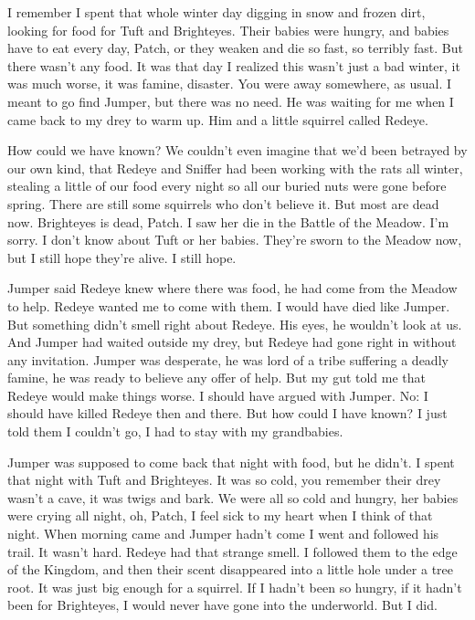 \documentclass[12pt]{book}
\begin{document}
 I remember I spent that whole winter day digging in snow and frozen dirt, looking for food for Tuft and Brighteyes. Their babies were hungry, and babies have to eat every day, Patch, or they weaken and die so fast, so terribly fast. But there wasn't any food. It was that day I realized this wasn't just a bad winter, it was much worse, it was famine, disaster. You were away somewhere, as usual. I meant to go find Jumper, but there was no need. He was waiting for me when I came back to my drey to warm up. Him and a little squirrel called Redeye.\par
 How could we have known? We couldn't even imagine that we'd been betrayed by our own kind, that Redeye and Sniffer had been working with the rats all winter, stealing a little of our food every night so all our buried nuts were gone before spring. There are still some squirrels who don't believe it. But most are dead now. Brighteyes is dead, Patch. I saw her die in the Battle of the Meadow. I'm sorry. I don't know about Tuft or her babies. They're sworn to the Meadow now, but I still hope they're alive. I still hope.\par
 Jumper said Redeye knew where there was food, he had come from the Meadow to help. Redeye wanted me to come with them. I would have died like Jumper. But something didn't smell right about Redeye. His eyes, he wouldn't look at us. And Jumper had waited outside my drey, but Redeye had gone right in without any invitation. Jumper was desperate, he was lord of a tribe suffering a deadly famine, he was ready to believe any offer of help. But my gut told me that Redeye would make things worse. I should have argued with Jumper. No: I should have killed Redeye then and there. But how could I have known? I just told them I couldn't go, I had to stay with my grandbabies.\par
 Jumper was supposed to come back that night with food, but he didn't. I spent that night with Tuft and Brighteyes. It was so cold, you remember their drey wasn't a cave, it was twigs and bark. We were all so cold and hungry, her babies were crying all night, oh, Patch, I feel sick to my heart when I think of that night. When morning came and Jumper hadn't come I went and followed his trail. It wasn't hard. Redeye had that strange smell. I followed them to the edge of the Kingdom, and then their scent disappeared into a little hole under a tree root. It was just big enough for a squirrel. If I hadn't been so hungry, if it hadn't been for Brighteyes, I would never have gone into the underworld. But I did.\par
\end{document}
